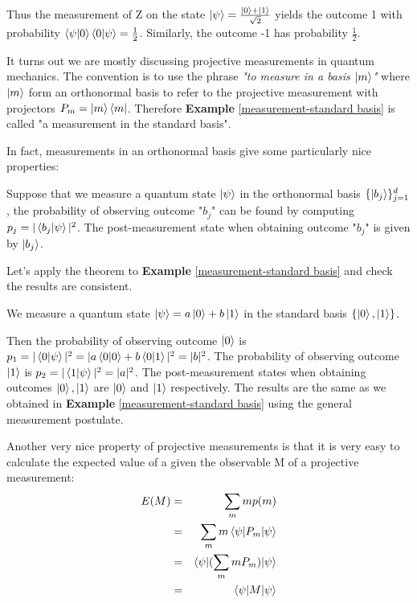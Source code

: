 {\begin{example}
Thus the measurement of Z on the state $\ket{\psi}=\frac{\ket{0}+\ket{1}}{\sqrt{2}}$ yields the outcome 1 with probability $\braket{\psi|0}\braket{0|\psi}=\frac{1}{2}$. Similarly, the outcome -1 has probability $\frac{1}{2}$.
\end{example}

It turns out we are mostly discussing projective measurements in quantum mechanics. The convention is to use the phrase \textit{"to measure in a basis $\ket{m}$"} where $\ket{m}$ form an orthonormal basis to refer to the projective measurement with projectors $P_m=\ket{m}\bra{m}$. Therefore \textbf{Example} \ref{measurement-standard basis} is called "a measurement in the standard basis". 

\bigskip

In fact, measurements in an orthonormal basis give some particularly nice properties:
\begin{theorem} \label{theorem: measurement in an orthonormal basis}
 Suppose that we measure a quantum state $\ket{\psi}$ in the orthonormal basis $\{\ket{b_j}\}_{j=1}^d$, the probability of observing outcome "$b_j$" can be found by computing $p_j=|\braket{b_j|\psi}|^2$. The post-measurement state when obtaining outcome "$b_j$" is given by $\ket{b_j}$.
\end{theorem}

Let's apply the theorem to \textbf{Example} \ref{measurement-standard basis} and check the results are consistent.
\begin{example}
We measure a quantum state $\ket{\psi}=a\ket{0}+b\ket{1}$ in the standard basis $\{\ket{0},\ket{1}\}$.

Then the probability of observing outcome $\ket{0}$ is $p_1=|\braket{0|\psi}|^2=|a\braket{0|0}+b\braket{0|1}|^2=|b|^2$. The probability of observing outcome $\ket{1}$ is $p_2=|\braket{1|\psi}|^2=|a|^2$. The post-measurement states when obtaining outcomes $\ket{0}, \ket{1}$ are $\ket{0}$ and $\ket{1}$ respectively. The results are the same as we obtained in \textbf{Example} \ref{measurement-standard basis} using the general measurement postulate.
\end{example}

Another very nice property of projective measurements is that it is very easy to calculate the expected value of a given the observable M of a projective measurement:
\begin{eqnarray}
E(M)&=&\sum_m mp(m)\\
&=&\sum_m m \braket{\psi|P_m|\psi}\\
&=&\braket{\psi|(\sum_m mP_m)|\psi}\\
&=&\braket{\psi|M|\psi}
\end{eqnarray}

}

